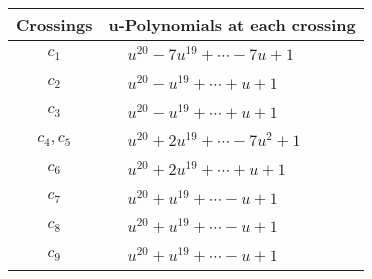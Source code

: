 \documentclass[1p]{elsarticle_modified}
\theoremstyle{definition}
\begin{document}
\begin{tabular}{m{50pt}|m{274pt}}
Crossings & \hspace{64pt}u-Polynomials at each crossing \\
\hline $$\begin{aligned}c_{1}\end{aligned}$$&$\begin{aligned}
&u^{20}-7 u^{19}+\cdots-7 u+1
\end{aligned}$\\
\hline $$\begin{aligned}c_{2}\end{aligned}$$&$\begin{aligned}
&u^{20}- u^{19}+\cdots+u+1
\end{aligned}$\\
\hline $$\begin{aligned}c_{3}\end{aligned}$$&$\begin{aligned}
&u^{20}- u^{19}+\cdots+u+1
\end{aligned}$\\
\hline $$\begin{aligned}c_{4},c_{5}\end{aligned}$$&$\begin{aligned}
&u^{20}+2 u^{19}+\cdots-7 u^2+1
\end{aligned}$\\
\hline $$\begin{aligned}c_{6}\end{aligned}$$&$\begin{aligned}
&u^{20}+2 u^{19}+\cdots+u+1
\end{aligned}$\\
\hline $$\begin{aligned}c_{7}\end{aligned}$$&$\begin{aligned}
&u^{20}+u^{19}+\cdots- u+1
\end{aligned}$\\
\hline $$\begin{aligned}c_{8}\end{aligned}$$&$\begin{aligned}
&u^{20}+u^{19}+\cdots- u+1
\end{aligned}$\\
\hline $$\begin{aligned}c_{9}\end{aligned}$$&$\begin{aligned}
&u^{20}+u^{19}+\cdots- u+1
\end{aligned}$\\

\end{tabular}
\end{document}
